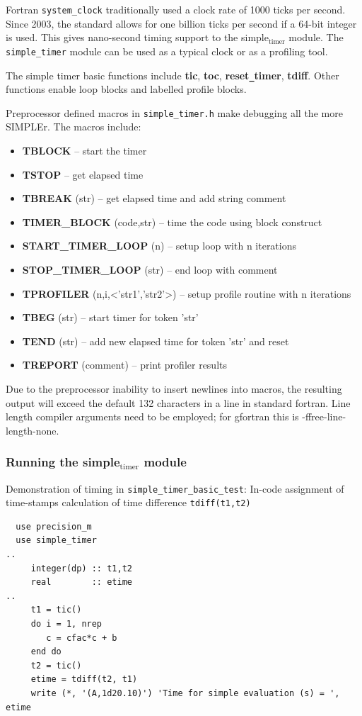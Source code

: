 \documentclass[a4paper,11pt]{article}
\begin{document}
Fortran \texttt{system\_clock} traditionally used a clock rate of 1000 ticks per
second. Since 2003, the standard allows for one billion ticks per second
if a 64-bit integer is used. This gives nano-second timing support to the
simple\(_{\text{timer}}\) module. The \texttt{simple\_timer} module can be used as a typical
clock or as a profiling tool.

The simple timer basic functions include \textbf{tic}, \textbf{toc}, \textbf{reset\texttt{\_}timer},
\textbf{tdiff}. Other functions enable loop blocks and labelled profile blocks.

Preprocessor defined macros in \texttt{simple\_timer.h} make debugging all the more SIMPLEr.
The macros include:
\begin{itemize}
\item \textbf{TBLOCK}  -- start the timer
\item \textbf{TSTOP}   -- get elapsed time
\item \textbf{TBREAK} (str)  -- get elapsed time and add string comment
\item \textbf{TIMER\_BLOCK} (code,str) -- time the code using block construct
\item \textbf{START\_TIMER\_LOOP} (n) -- setup loop with n iterations
\item \textbf{STOP\_TIMER\_LOOP} (str)  -- end loop with comment
\item \textbf{TPROFILER} (n,i,<'str1','str2'>) -- setup profile routine with n iterations
\item \textbf{TBEG} (str)  -- start timer for token 'str'
\item \textbf{TEND} (str)  -- add new elapsed time for token 'str' and reset
\item \textbf{TREPORT} (comment) -- print profiler results
\end{itemize}

Due to the preprocessor inability to insert newlines into macros, the resulting
output will exceed the default 132 characters in a line in standard fortran.
Line length compiler arguments need to be employed; for gfortran this is
-ffree-line-length-none.

\subsubsection{Running the simple\(_{\text{timer}}\) module}
\label{sec:orgc628b09}
Demonstration of timing  in \texttt{simple\_timer\_basic\_test}:
 In-code assignment of time-stamps
 calculation of time difference \texttt{tdiff(t1,t2)}
\begin{lstlisting}
  use precision_m
  use simple_timer
..
     integer(dp) :: t1,t2
     real        :: etime
..
     t1 = tic()
     do i = 1, nrep
        c = cfac*c + b
     end do
     t2 = tic()
     etime = tdiff(t2, t1)
     write (*, '(A,1d20.10)') 'Time for simple evaluation (s) = ', etime
\end{lstlisting}
\end{document}
